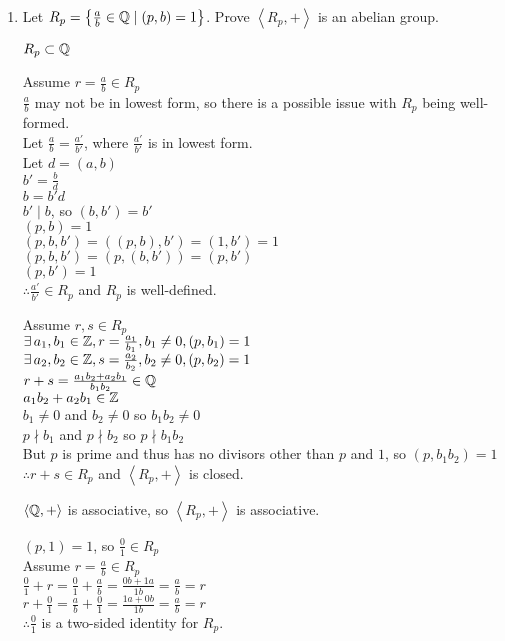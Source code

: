 \documentclass[letterpaper,12pt,fleqn]{article}
\newcommand{\bas}[2]{\left<#1,#2\right>}
\begin{document}
\begin{enumerate}[label=\alph*)]
\item Let $R_p=\left\{\frac{a}{b}\in\mathbb{Q}\mid(p,b)=1\right\}$.
  Prove $\bas{R_p}{+}$ is an abelian group.

  $R_p\subset\mathbb{Q}$

  Assume $r=\frac{a}{b}\in R_p$ \\
  $\frac{a}{b}$ may not be in lowest form, so there is a possible issue with
  $R_p$ being well-formed. \\
  Let $\frac{a}{b}=\frac{a'}{b'}$, where $\frac{a'}{b'}$ is in lowest form. \\
  Let $d=(a,b)$ \\
  $b'=\frac{b}{d}$ \\
  $b=b'd$ \\
  $b'\mid b$, so $(b,b')=b'$ \\
  $(p,b)=1$ \\
  $(p,b,b')=((p,b),b')=(1,b')=1$ \\
  $(p,b,b')=(p,(b,b'))=(p,b')$ \\
  $(p,b')=1$ \\
  $\therefore \frac{a'}{b'}\in R_p$ and $R_p$ is well-defined.

  Assume $r,s\in R_p$ \\
  $\exists\,a_1,b_1\in\mathbb{Z},r=\frac{a_1}{b_1},b_1\ne0,(p,b_1)=1$ \\
  $\exists\,a_2,b_2\in\mathbb{Z},s=\frac{a_2}{b_2},b_2\ne0,(p,b_2)=1$ \\
  $r+s=\frac{a_1b_2+a_2b_1}{b_1b_2}\in\mathbb{Q}$ \\
  $a_1b_2+a_2b_1\in\mathbb{Z}$ \\
  $b_1\ne0$ and $b_2\ne0$ so $b_1b_2\ne0$ \\
  $p\nmid b_1$ and $p\nmid b_2$ so $p\nmid b_1b_2$ \\
  But $p$ is prime and thus has no divisors other than $p$ and $1$, so
  $(p,b_1b_2)=1$ \\
  $\therefore r+s\in R_p$ and $\bas{R_p}{+}$ is closed.

  $\bas{\Q}{+}$ is associative, so $\bas{R_p}{+}$ is associative.

  $(p,1)=1$, so $\frac{0}{1}\in R_p$ \\
  Assume $r=\frac{a}{b}\in R_p$ \\
  $\frac{0}{1}+r=\frac{0}{1}+\frac{a}{b}=\frac{0b+1a}{1b}=\frac{a}{b}=r$ \\
  $r+\frac{0}{1}=\frac{a}{b}+\frac{0}{1}=\frac{1a+0b}{1b}=\frac{a}{b}=r$ \\
  $\therefore \frac{0}{1}$ is a two-sided identity for $R_p$.


\end{enumerate}
\end{document}
